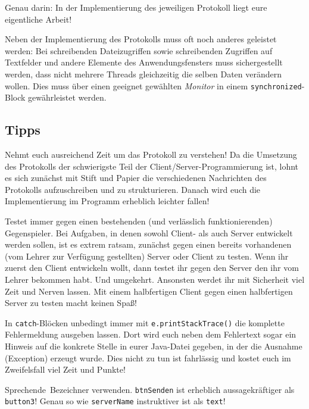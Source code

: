 Genau darin: In der Implementierung des jeweiligen Protokoll liegt eure
eigentliche Arbeit!

Neben der Implementierung des Protokolls muss oft noch anderes geleistet
werden: Bei schreibenden Dateizugriffen sowie schreibenden Zugriffen auf
Textfelder und andere Elemente des Anwendungsfensters muss sichergestellt
werden, dass nicht mehrere Threads gleichzeitig die selben Daten verändern
wollen. Dies muss über einen geeignet gewählten \emph{Monitor} in einem
\lstinline|synchronized|-Block gewährleistet werden.

\subsection{Tipps}

\begin{compactitem}
\item Nehmt euch ausreichend Zeit um das Protokoll zu verstehen! Da die
Umsetzung des Protokolls der schwierigste Teil der Client/Server-Programmierung
ist, lohnt es sich zunächst mit Stift und Papier die verschiedenen Nachrichten
des Protokolls aufzuschreiben und zu strukturieren. Danach wird euch die
Implementierung im Programm erheblich leichter fallen!

\item Testet immer gegen einen bestehenden (und verlässlich funktionierenden)
\glqq Gegenspieler\grqq . Bei Aufgaben, in denen sowohl Client- als auch Server
entwickelt werden sollen, ist es extrem ratsam, zunächst gegen einen bereits
vorhandenen (vom Lehrer zur Verfügung gestellten) Server oder Client zu testen.
Wenn ihr zuerst den Client entwickeln wollt, dann testet ihr gegen den Server
den ihr vom Lehrer bekommen habt. Und umgekehrt. Ansonsten werdet ihr mit
Sicherheit viel Zeit und Nerven lassen. Mit einem halbfertigen Client gegen
einen halbfertigen Server zu testen macht keinen Spaß!

\item In \lstinline|catch|-Blöcken unbedingt immer mit
\lstinline|e.printStackTrace()| die komplette Fehlermeldung ausgeben lassen.
Dort wird euch neben dem Fehlertext sogar ein Hinweis auf die konkrete Stelle
in eurer Java-Datei gegeben, in der die Ausnahme (Exception) erzeugt wurde.
Dies nicht zu tun ist fahrlässig und kostet euch im Zweifelsfall viel Zeit und
Punkte!

\item \glqq Sprechende\grqq\ Bezeichner verwenden. \lstinline|btnSenden| ist
erheblich aussagekräftiger als \lstinline|button3|! Genau so wie
\lstinline|serverName| instruktiver ist als \lstinline|text|!
\end{compactitem}

